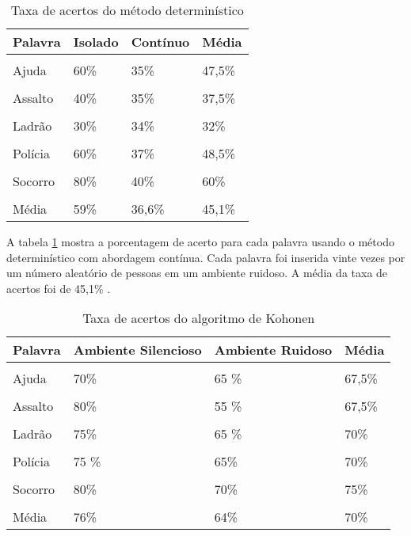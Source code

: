 \begin{table}[H]
\centering
\caption{Taxa de acertos do método determinístico}
\label{tab:comp2}
\smallskip
\begin{tabular}{|l|l|l|l|}
\hline
 Palavra & Isolado & Contínuo & Média\\[0.5ex]
\hline
&&&\\[-2ex]
Ajuda & 60\% &  35\% &  47,5\%\\[0.5ex]
\hline
&&&\\[-2ex]
Assalto & 40\% &  35\% &  37,5\% \\[0.5ex]
\hline
&&&\\[-2ex]
Ladrão & 30\% & 34\% & 32\%\\[0.5ex]
\hline
&&&\\[-2ex]
Polícia & 60\% & 37\% & 48,5\%\\[0.5ex]
\hline
&&&\\[-2ex]
Socorro & 80\% & 40\% & 60\%\\[0.5ex]
\hline
&&&\\[-2ex]
Média & 59\% & 36,6\% & 45,1\%\\[0.5ex]
\hline
\end{tabular}
\end{table}


A tabela \ref{tab:comp2} mostra a porcentagem de acerto para cada palavra usando o método determinístico com abordagem contínua. Cada palavra foi inserida vinte vezes por um número aleatório de pessoas  em um ambiente ruidoso. A média da taxa de acertos foi de 45,1\% .

\begin{table}[H]
\centering
\caption{Taxa de acertos do algoritmo de Kohonen}
\label{tab:comp3}
\smallskip
\begin{tabular}{|l|l|l|l|}
\hline
 Palavra & Ambiente Silencioso & Ambiente Ruidoso & Média\\[0.5ex]
\hline
&&&\\[-2ex]
Ajuda & 70\% &  65 \% &  67,5\% \\[0.5ex]
\hline
&&&\\[-2ex]
Assalto & 80\% &  55 \% &  67,5\% \\[0.5ex]
\hline
&&&\\[-2ex]
Ladrão & 75\% &  65 \%&  70\% \\[0.5ex]
\hline
&&&\\[-2ex]
Polícia & 75 \% & 65\% & 70\% \\[0.5ex]
\hline
&&&\\[-2ex]
Socorro & 80\% & 70\% & 75\% \\[0.5ex]
\hline
&&&\\[-2ex]
Média & 76\% & 64\% & 70\%\\[0.5ex]
\hline
\end{tabular}
\end{table}

